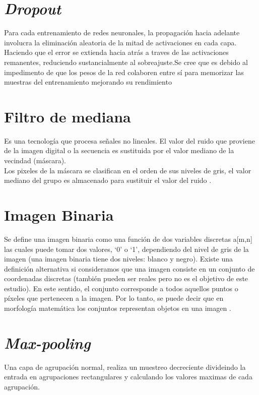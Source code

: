 \section{\textit{Dropout}}

Para cada entrenamiento de redes neuronales, la propagación hacia adelante involucra la eliminación aleatoria de la mitad de activaciones en cada capa. Haciendo que el error se extienda hacia atrás a traves de las activaciones remanentes, reduciendo sustancialmente al sobreajuste.Se cree que es debido al impedimento de que los pesos de la red colaboren entre sí para memorizar las muestras del entrenamiento mejorando su rendimiento \cite{hinton2012improving}

\section{Filtro de mediana}

Es una tecnología que procesa señales no lineales. El valor del ruido que proviene de la imagen digital o la secuencia es sustituida por el valor mediano de la vecindad (máscara).\\
Los pixeles de la máscara se clasifican en el orden de sus niveles de gris, el valor mediano del grupo es almacenado para sustituir el valor del ruido \cite{zhu2012improved}.

\section{Imagen Binaria} Se define una imagen binaria como una función de dos variables discretas
a[m,n] las cuales puede tomar dos valores, ‘0’ o ‘1’, dependiendo del nivel de gris de la
imagen (una imagen binaria tiene dos niveles: blanco y negro). Existe una definición alternativa si consideramos que una imagen consiste en un conjunto de
coordenadas discretas (también pueden ser reales pero no es el objetivo de este estudio). En este sentido, el conjunto corresponde a todos aquellos puntos o píxeles que pertenecen a la imagen. Por lo tanto, se puede decir que en morfología matemática los conjuntos representan objetos en una imagen \cite{ref_12}.

\section{\textit{Max-pooling}}

Una capa de agrupación normal, realiza un muestreo decreciente divideindo la entrada en agrupaciones rectangulares y calculando los valores maximas de cada agrupación.\\

